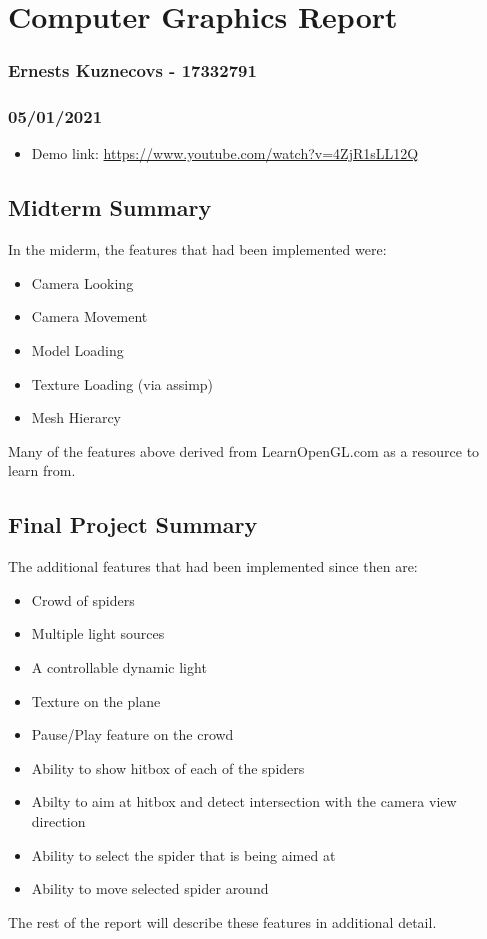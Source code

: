 \documentclass[11pt]{article}
\date{\today}
\title{}
\begin{document}
\section*{Computer Graphics Report}
\label{sec:org1c7b823}
\subsubsection*{Ernests Kuznecovs - 17332791}
\label{sec:org1e5f318}
\subsubsection*{05/01/2021}
\label{sec:org794180e}
\begin{itemize}
\item Demo link: \url{https://www.youtube.com/watch?v=4ZjR1sLL12Q}
\end{itemize}

\subsection*{Midterm Summary}
\label{sec:org552150f}
In the miderm, the features that had been implemented were:   
\begin{itemize}
\item Camera Looking
\item Camera Movement
\item Model Loading
\item Texture Loading (via assimp)
\item Mesh Hierarcy
\end{itemize}
Many of the features above derived from LearnOpenGL.com as a resource to learn from.

\subsection*{Final Project Summary}
\label{sec:org9dc0f5c}
The additional features that had been implemented since then are:
\begin{itemize}
\item Crowd of spiders
\item Multiple light sources
\item A controllable dynamic light
\item Texture on the plane
\item Pause/Play feature on the crowd
\item Ability to show hitbox of each of the spiders
\item Abilty to aim at hitbox and detect intersection with the camera view direction
\item Ability to select the spider that is being aimed at
\item Ability to move selected spider around
\end{itemize}
The rest of the report will describe these features in additional detail.
\end{document}

